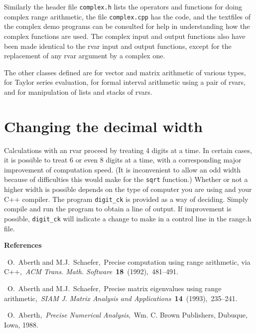 Similarly the header file {\tt complex.h} lists the operators and functions
for doing complex range arithmetic, the file {\tt complex.cpp} has the code,
and the textfiles of the complex demo programs can be consulted for help
in understanding how the complex functions are used. The complex input
and output functions also have been made identical to the rvar input
and output functions, except for the replacement of any rvar argument by
a complex one.

The other classes defined are for vector and matrix arithmetic
of various types, for Taylor series evaluation, for formal interval arithmetic
using a pair of rvars,
and for manipulation of lists and stacks of rvars.

\section{Changing the decimal width}
Calculations with an rvar proceed by treating 4 digits at a time.
In certain cases, it is possible to treat 6 or
even 8 digits at a time, with a corresponding major improvement of
computation speed. (It is inconvenient to allow an odd width
because of difficulties this would make for the
{\tt sqrt} function.)
Whether or not a higher width is possible depends on the type of computer
you are using and your C++ compiler.  The program {\tt digit\_ck} is
provided as a way of deciding.  Simply
compile and run the program to obtain a line of output. 
If improvement is possible, {\tt digit\_ck}
will indicate a change to make in a control line in the range.h file.
\bigskip\bigskip
\centerline{\bf References}
\def\paper#1#2#3#4#5#6#7{\par\smallskip\noindent%
[#1]\ #2,\ #3,\ {\sl#4\/}\ {\bf#5}\ (#6),\ #7.}
\def\book#1#2#3#4{\par\smallskip\noindent
[#1]\ #2,\ {\sl#3\/},\ #4.}
\paper{1}{O.~Aberth and M.J.~Schaefer}{Precise computation
using range arithmetic, via C++}{ACM Trans. Math. Software}{18}{1992}{481--491}
\paper{2}{O.~Aberth and M.J.~Schaefer}{Precise matrix eigenvalues using
range arithmetic}{SIAM J. Matrix Analysis and Applications}
{14}{1993}{235--241}
\book{3}{O.~Aberth}{Precise Numerical Analysis}
{Wm. C. Brown Publishers, Dubuque, Iowa, 1988}
\bye

